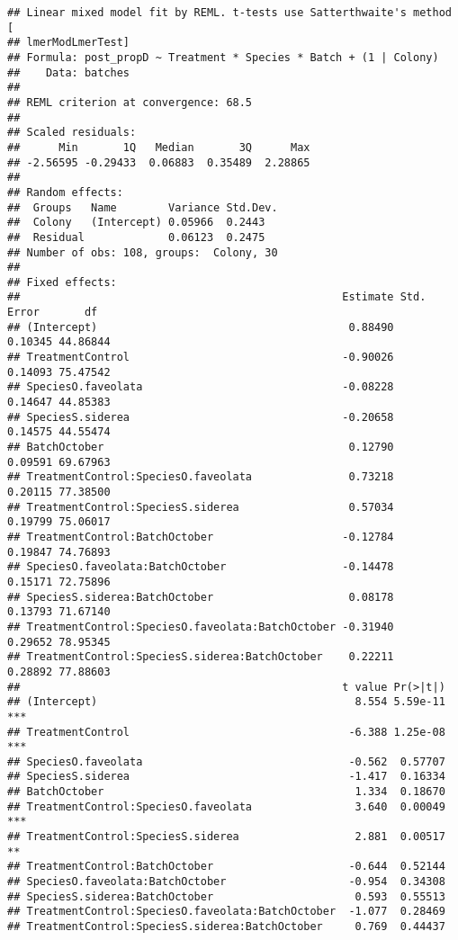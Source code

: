 \documentclass[]{article}
\begin{document}
\begin{verbatim}
## Linear mixed model fit by REML. t-tests use Satterthwaite's method [
## lmerModLmerTest]
## Formula: post_propD ~ Treatment * Species * Batch + (1 | Colony)
##    Data: batches
## 
## REML criterion at convergence: 68.5
## 
## Scaled residuals: 
##      Min       1Q   Median       3Q      Max 
## -2.56595 -0.29433  0.06883  0.35489  2.28865 
## 
## Random effects:
##  Groups   Name        Variance Std.Dev.
##  Colony   (Intercept) 0.05966  0.2443  
##  Residual             0.06123  0.2475  
## Number of obs: 108, groups:  Colony, 30
## 
## Fixed effects:
##                                                  Estimate Std. Error       df
## (Intercept)                                       0.88490    0.10345 44.86844
## TreatmentControl                                 -0.90026    0.14093 75.47542
## SpeciesO.faveolata                               -0.08228    0.14647 44.85383
## SpeciesS.siderea                                 -0.20658    0.14575 44.55474
## BatchOctober                                      0.12790    0.09591 69.67963
## TreatmentControl:SpeciesO.faveolata               0.73218    0.20115 77.38500
## TreatmentControl:SpeciesS.siderea                 0.57034    0.19799 75.06017
## TreatmentControl:BatchOctober                    -0.12784    0.19847 74.76893
## SpeciesO.faveolata:BatchOctober                  -0.14478    0.15171 72.75896
## SpeciesS.siderea:BatchOctober                     0.08178    0.13793 71.67140
## TreatmentControl:SpeciesO.faveolata:BatchOctober -0.31940    0.29652 78.95345
## TreatmentControl:SpeciesS.siderea:BatchOctober    0.22211    0.28892 77.88603
##                                                  t value Pr(>|t|)    
## (Intercept)                                        8.554 5.59e-11 ***
## TreatmentControl                                  -6.388 1.25e-08 ***
## SpeciesO.faveolata                                -0.562  0.57707    
## SpeciesS.siderea                                  -1.417  0.16334    
## BatchOctober                                       1.334  0.18670    
## TreatmentControl:SpeciesO.faveolata                3.640  0.00049 ***
## TreatmentControl:SpeciesS.siderea                  2.881  0.00517 ** 
## TreatmentControl:BatchOctober                     -0.644  0.52144    
## SpeciesO.faveolata:BatchOctober                   -0.954  0.34308    
## SpeciesS.siderea:BatchOctober                      0.593  0.55513    
## TreatmentControl:SpeciesO.faveolata:BatchOctober  -1.077  0.28469    
## TreatmentControl:SpeciesS.siderea:BatchOctober     0.769  0.44437    

\end{verbatim}
\end{document}
